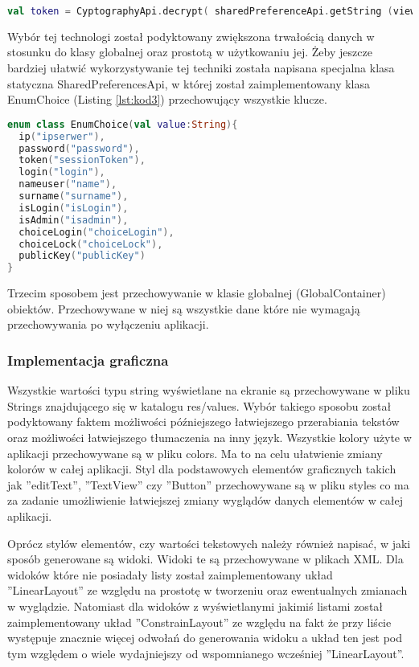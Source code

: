 \documentclass[twoside,10pt]{article}
\begin{document}
\begin{lstlisting}[caption={Fragment kodu odpowiedzialny za odczytanie tokenu}, label={lst:kod2}, language=Kotlin]
val token = CyptographyApi.decrypt( sharedPreferenceApi.getString (view, EnumChoice.token))
\end{lstlisting}

Wybór tej technologi został podyktowany zwiększona trwałością danych w stosunku do klasy globalnej oraz prostotą w użytkowaniu jej. Żeby jeszcze bardziej ułatwić wykorzystywanie tej techniki została napisana specjalna klasa statyczna SharedPreferencesApi, w której został zaimplementowany klasa EnumChoice \linebreak (Listing \ref{lst:kod3}) przechowujący wszystkie klucze.

\begin{lstlisting}[caption={klasa EnumChoice.}, label={lst:kod3}, language=Kotlin]
enum class EnumChoice(val value:String){
  ip("ipserwer"),
  password("password"),
  token("sessionToken"),
  login("login"), 
  nameuser("name"), 
  surname("surname"),
  isLogin("isLogin"), 
  isAdmin("isadmin"),
  choiceLogin("choiceLogin"), 
  choiceLock("choiceLock"),
  publicKey("publicKey")
}
\end{lstlisting}

Trzecim sposobem jest przechowywanie w klasie globalnej (GlobalContainer)  obiektów. Przechowywane w niej są wszystkie dane które nie wymagają przechowywania po wyłączeniu aplikacji.

\subsubsection{Implementacja graficzna}

Wszystkie wartości typu string wyświetlane na ekranie są przechowywane w pliku Strings znajdującego się w katalogu res/values. Wybór takiego sposobu został podyktowany faktem możliwości późniejszego łatwiejszego przerabiania tekstów oraz możliwości łatwiejszego tłumaczenia na inny język. Wszystkie kolory użyte w aplikacji przechowywane są w pliku colors. Ma to na celu ułatwienie  zmiany kolorów w całej aplikacji. Styl dla podstawowych elementów graficznych takich jak ''editText'', ''TextView'' czy ''Button'' przechowywane są w pliku styles co ma za zadanie umożliwienie łatwiejszej zmiany wyglądów danych elementów w całej aplikacji.

Oprócz stylów elementów, czy wartości tekstowych należy również napisać, w jaki sposób generowane są widoki. Widoki te są przechowywane w plikach XML.  Dla widoków które nie posiadały listy został zaimplementowany układ ''LinearLayout'' ze względu na prostotę w tworzeniu oraz ewentualnych zmianach w wyglądzie. Natomiast dla widoków z wyświetlanymi jakimiś listami został zaimplementowany układ ''ConstrainLayout'' ze względu na fakt że przy liście występuje znacznie więcej odwołań do generowania widoku a układ ten jest pod tym względem o wiele wydajniejszy od wspomnianego wcześniej ''LinearLayout''\cite{desingMobile}.
\end{document}
